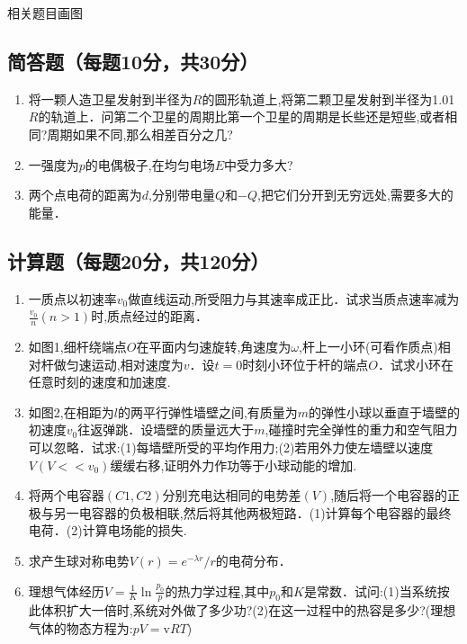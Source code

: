 
\begin{issues}
\issueTODO
相关题目画图
\end{issues}


\subsection{ 简答题（每题10分，共30分）}
\begin{enumerate}
\item 将一颗人造卫星发射到半径为$R$的圆形轨道上,将第二颗卫星发射到半径为1.01$R$的轨道上．问第二个卫星的周期比第一个卫星的周期是长些还是短些,或者相同?周期如果不同,那么相差百分之几?

\item 一强度为$p$的电偶极子,在均匀电场$E$中受力多大?

\item 两个点电荷的距离为$d$,分别带电量$Q$和$-Q$,把它们分开到无穷远处,需要多大的能量．
\end{enumerate}
\subsection{计算题（每题20分，共120分）}
\begin{enumerate}
\item 一质点以初速率$v_0$做直线运动,所受阻力与其速率成正比．试求当质点速率减为$\frac{v_0}{n}(n>1)$时,质点经过的距离．

\item 如图1,细杆绕端点$O$在平面内匀速旋转,角速度为$\omega$,杆上一小环(可看作质点)相对杆做匀速运动,相对速度为$v$．设$t=0$时刻小环位于杆的端点$O$．试求小环在任意时刻的速度和加速度.

\item 如图2,在相距为$l$的两平行弹性墙壁之间,有质量为$m$的弹性小球以垂直于墙壁的初速度$v_0$往返弹跳．设墙壁的质量远大于$m$,碰撞时完全弹性的重力和空气阻力可以忽略．试求:(1)每墙壁所受的平均作用力;(2)若用外力使左墙壁以速度$V(V<<v_0)$缓缓右移,证明外力作功等于小球动能的增加.

\item 将两个电容器$(C1,C2)$分别充电达相同的电势差$(V)$,随后将一个电容器的正极与另一电容器的负极相联,然后将其他两极短路．(1)计算每个电容器的最终电荷．(2)计算电场能的损失.

\item 求产生球对称电势$V(r)=e^{-\lambda r}/r$的电荷分布．

\item 理想气体经历$V=\frac{1}{K} \ln \frac{p_{0}}{p}$的热力学过程,其中$p_0$和$K$是常数．试问:(1)当系统按此体积扩大一倍时,系统对外做了多少功?(2)在这一过程中的热容是多少?(理想气体的物态方程为:$pV=\mathrm v RT$)
\end{enumerate}
